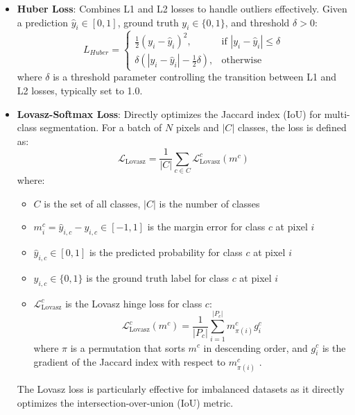 \documentclass[review]{elsarticle}
\begin{document}
\begin{itemize}
    \item \textbf{Huber Loss}: Combines L1 and L2 losses to handle outliers effectively. Given a prediction $\hat{y}_i \in [0,1]$, ground truth $y_i \in \{0,1\}$, and threshold $\delta > 0$:
    \begin{equation}
        L_{Huber} = 
        \begin{cases} 
            \frac{1}{2} (y_i - \hat{y}_i)^2, & \text{if } |y_i - \hat{y}_i| \leq \delta \\ 
            \delta (|y_i - \hat{y}_i| - \frac{1}{2} \delta), & \text{otherwise} 
        \end{cases}
    \end{equation}
    where $\delta$ is a threshold parameter controlling the transition between L1 and L2 losses, typically set to 1.0.

    \item \textbf{Lovasz-Softmax Loss}: Directly optimizes the Jaccard index (IoU) for multi-class segmentation. For a batch of $N$ pixels and $|C|$ classes, the loss is defined as:
    \begin{equation}\label{lovasz-loss}
        \mathcal{L}_{\text{Lovasz}} = \frac{1}{|C|} \sum_{c \in C} \mathcal{L}_{\text{Lovasz}}^c(m^c)
    \end{equation}
    where:
    \begin{itemize}
        \item $C$ is the set of all classes, $|C|$ is the number of classes
        \item $m^c_i = \hat{y}_{i,c} - y_{i,c} \in [-1,1]$ is the margin error for class $c$ at pixel $i$
        \item $\hat{y}_{i,c} \in [0,1]$ is the predicted probability for class $c$ at pixel $i$
        \item $y_{i,c} \in \{0,1\}$ is the ground truth label for class $c$ at pixel $i$
        \item $\mathcal{L}_{\text{Lovasz}}^c$ is the Lovasz hinge loss for class $c$:
        \begin{equation}
            \mathcal{L}_{\text{Lovasz}}^c(m^c) = \frac{1}{|P_c|} \sum_{i=1}^{|P_c|} m^c_{\pi(i)} g_i^c
        \end{equation}
        where $\pi$ is a permutation that sorts $m^c$ in descending order, and $g_i^c$ is the gradient of the Jaccard index with respect to $m^c_{\pi(i)}$ \cite{Berman2018}.
    \end{itemize}
    The Lovasz loss is particularly effective for imbalanced datasets as it directly optimizes the intersection-over-union (IoU) metric.
\end{itemize}
\end{document}
